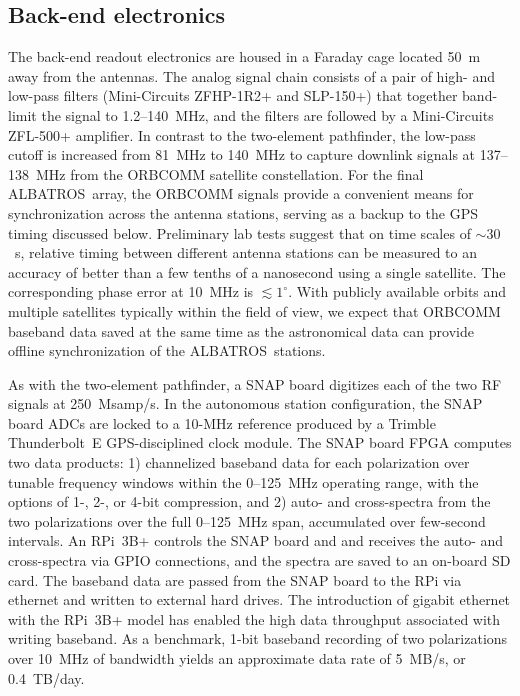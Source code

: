 \documentclass{ws-jai}
\def\albatros{ALBATROS}
\begin{document}

\subsection{Back-end electronics}\label{s:autonomous_backend}

The back-end readout electronics are housed in a Faraday cage located
50~m away from the antennas. The analog signal chain consists of a
pair of high- and low-pass filters (Mini-Circuits ZFHP-1R2+ and
SLP-150+) that together band-limit the signal to 1.2--140~MHz, and the
filters are followed by a Mini-Circuits ZFL-500+ amplifier.  In
contrast to the two-element pathfinder, the low-pass cutoff is
increased from 81~MHz to 140~MHz to capture downlink signals at
137--138~MHz from the ORBCOMM satellite constellation.  For the final
\albatros\ array, the ORBCOMM signals provide a convenient means for
synchronization across the antenna stations, serving as a backup to
the GPS timing discussed below.  Preliminary lab tests suggest that on
time scales of $\sim30$~s, relative timing between different antenna
stations can be measured to an accuracy of better than a few tenths of
a nanosecond using a single satellite.  The corresponding phase error
at 10~MHz is $\lesssim1^\circ$.  With publicly available orbits and
multiple satellites typically within the field of view, we expect that
ORBCOMM baseband data saved at the same time as the astronomical data
can provide offline synchronization of the \albatros\ stations.

As with the two-element pathfinder, a SNAP board digitizes each of the
two RF signals at 250~Msamp/s. In the autonomous station
configuration, the SNAP board ADCs are locked to a 10-MHz reference
produced by a Trimble Thunderbolt~E GPS-disciplined clock module.  The
SNAP board FPGA computes two data products: 1) channelized baseband
data for each polarization over tunable frequency windows within the
0--125~MHz operating range, with the options of 1-, 2-, or 4-bit
compression, and 2) auto- and cross-spectra from the two polarizations
over the full 0--125~MHz span, accumulated over few-second intervals.
An RPi~3B+ controls the SNAP board and and receives the auto- and
cross-spectra via GPIO connections, and the spectra are saved to an
on-board SD card.  The baseband data are passed from the SNAP board to
the RPi via ethernet and written to external hard drives.  The
introduction of gigabit ethernet with the RPi~3B+ model has enabled
the high data throughput associated with writing baseband.  As a
benchmark, 1-bit baseband recording of two polarizations over 10~MHz
of bandwidth yields an approximate data rate of 5~MB/s, or 0.4~TB/day.
\end{document}
